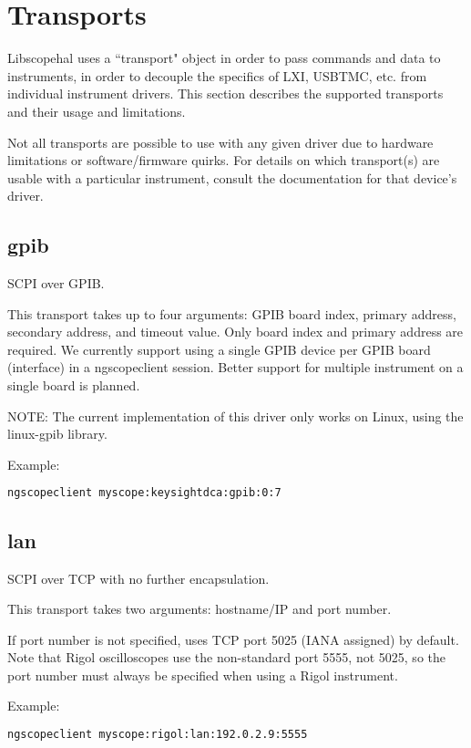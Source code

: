 \chapter{Transports}
\label{sec:transports}

Libscopehal uses a ``transport" object in order to pass commands and data to instruments, in order to decouple the
specifics of LXI, USBTMC, etc. from individual instrument drivers. This section describes the supported transports and
their usage and limitations.

Not all transports are possible to use with any given driver due to hardware limitations or software/firmware quirks.
For details on which transport(s) are usable with a particular instrument, consult the documentation for that device's
driver.

\section{gpib}

SCPI over GPIB.

This transport takes up to four arguments: GPIB board index, primary address, secondary address, and timeout value.
Only board index and primary address are required. We currently support using a single GPIB device per GPIB board 
(interface) in a ngscopeclient session. Better support for multiple instrument on a single board is planned.

NOTE: The current implementation of this driver only works on Linux, using the linux-gpib library.

Example:
\begin{lstlisting}[language=sh, numbers=none]
ngscopeclient myscope:keysightdca:gpib:0:7
\end{lstlisting}

\section{lan}

SCPI over TCP with no further encapsulation.

This transport takes two arguments: hostname/IP and port number.

If port number is not specified, uses TCP port 5025 (IANA assigned) by default. Note that Rigol oscilloscopes use the
non-standard port 5555, not 5025, so the port number must always be specified when using a Rigol instrument.

Example:
\begin{lstlisting}[language=sh, numbers=none]
ngscopeclient myscope:rigol:lan:192.0.2.9:5555
\end{lstlisting}


